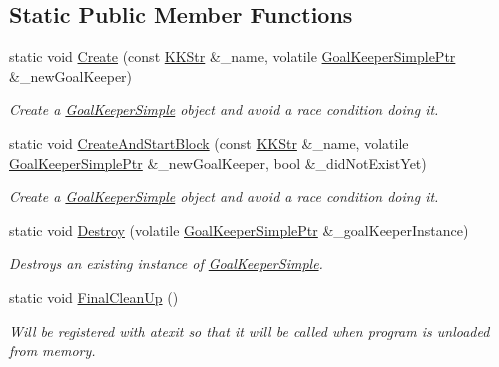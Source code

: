 \subsection*{Static Public Member Functions}
\begin{DoxyCompactItemize}
\item 
static void \hyperlink{class_k_k_b_1_1_goal_keeper_simple_a7001b3a689776a4ef2b56219f965b26c}{Create} (const \hyperlink{class_k_k_b_1_1_k_k_str}{K\+K\+Str} \&\+\_\+name, volatile \hyperlink{class_k_k_b_1_1_goal_keeper_simple_a5e73be577d62a04e6980bb94027f653b}{Goal\+Keeper\+Simple\+Ptr} \&\+\_\+new\+Goal\+Keeper)
\begin{DoxyCompactList}\small\item\em Create a \hyperlink{class_k_k_b_1_1_goal_keeper_simple}{Goal\+Keeper\+Simple} object and avoid a race condition doing it. \end{DoxyCompactList}\item 
static void \hyperlink{class_k_k_b_1_1_goal_keeper_simple_a3cdf495c3b29603a4434ad16a76bc049}{Create\+And\+Start\+Block} (const \hyperlink{class_k_k_b_1_1_k_k_str}{K\+K\+Str} \&\+\_\+name, volatile \hyperlink{class_k_k_b_1_1_goal_keeper_simple_a5e73be577d62a04e6980bb94027f653b}{Goal\+Keeper\+Simple\+Ptr} \&\+\_\+new\+Goal\+Keeper, bool \&\+\_\+did\+Not\+Exist\+Yet)
\begin{DoxyCompactList}\small\item\em Create a \hyperlink{class_k_k_b_1_1_goal_keeper_simple}{Goal\+Keeper\+Simple} object and avoid a race condition doing it. \end{DoxyCompactList}\item 
static void \hyperlink{class_k_k_b_1_1_goal_keeper_simple_aa1098674662d5e6a03fb4af27e1c5af5}{Destroy} (volatile \hyperlink{class_k_k_b_1_1_goal_keeper_simple_a5e73be577d62a04e6980bb94027f653b}{Goal\+Keeper\+Simple\+Ptr} \&\+\_\+goal\+Keeper\+Instance)
\begin{DoxyCompactList}\small\item\em Destroys an existing instance of \hyperlink{class_k_k_b_1_1_goal_keeper_simple}{Goal\+Keeper\+Simple}. \end{DoxyCompactList}\item 
static void \hyperlink{class_k_k_b_1_1_goal_keeper_simple_a8b38fb338438be5de8e2aaa2ac3b227d}{Final\+Clean\+Up} ()
\begin{DoxyCompactList}\small\item\em Will be registered with \textquotesingle{}atexit\textquotesingle{} so that it will be called when program is unloaded from memory. \end{DoxyCompactList}\end{DoxyCompactItemize}
